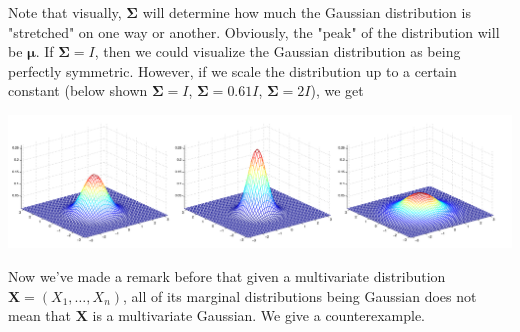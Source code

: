 \documentclass{article}
\begin{document}
  Note that visually, $\boldsymbol{\Sigma}$ will determine how much the Gaussian distribution is "stretched" on one way or another. Obviously, the "peak" of the distribution will be $\boldsymbol{\mu}$. If $\boldsymbol{\Sigma} = I$, then we could visualize the Gaussian distribution as being perfectly symmetric. However, if we scale the distribution up to a certain constant (below shown $\boldsymbol{\Sigma} = I$, $\boldsymbol{\Sigma} = 0.61 I$, $\boldsymbol{\Sigma} = 2 I$), we get
  \begin{center}
      \includegraphics[scale=0.65]{img/Gaussian_Distribution.png}
  \end{center}

  Now we've made a remark before that given a multivariate distribution $\mathbf{X} = (X_1, \ldots, X_n)$, all of its marginal distributions being Gaussian does not mean that $\mathbf{X}$ is a multivariate Gaussian. We give a counterexample. 
\end{document}
